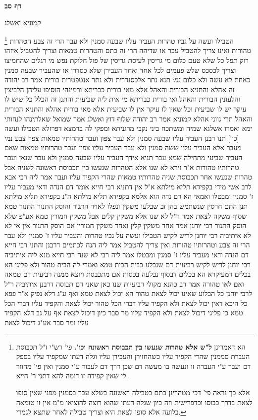 \documentclass[12pt, openany]{book}
\newcommand{\sethebfont}{
\fontsize{10.5pt}{21.0pt} \selectfont
}
\newcommand{\twocol}[1]{
	{\sethebfont \begin{multicols}{2}
			#1
	\end{multicols}}	
}
\newcommand{\sectname}{}
\newcommand{\newsection}[1]{
	\addcontentsline{toc}{section}{#1}
	\renewcommand{\sectname}{#1}	
	\vspace{-\baselineskip}
	\begin{center}
		\textbf{%
\fontsize{16pt}{16pt}\selectfont
			#1}
	\end{center}
	\vspace{-\baselineskip}
	\nopagebreak
}
\newcommand{\footnotecomment}[1]{
	\renewcommand\thefootnote{}
	\footnote{#1}}
\newcommand{\commenta}[1]{\footnotecomment{#1}}
\begin{document}
\newsection{דף סב}
\twocol{קמוניא ואשלג
\commenta{הא דאמרינן \textbf{ל"ש אלא טהרות שנעשו בין תכבוסת ראשונה וכו'.} פי' רש"י ז"ל תכבוסת העברת סממנין שהרי הקפיד עליו כשהחזירן והעבירן עליו וגלה דעתו שמקפיד עליו בספק דם ועבר ע"י העברה זו ונעשה בו מעשה דם שכן דרך דם לעבור ע"י סמנין ואין פי' מחוור לי שאין קפידה זו דומה להא דתני ר' חייא.\par אלא כך נראה פי' דכי מטהרינן כתם בטבילה ראשונה כשלא עבר בסמנין מפני שאין סופו לצאת בדרך כבוסו וכדפרישית וזה כיון שגלה דעתו שהוא רוצה להוציאו מ"מ אין זו טומאה בלועה אלא סופו לצאת היא וצריך טבילה לאחר שתצא לגמרי. }
הטבילו ועשה על גביו טהרות העביר עליו שבעה סמנין ולא עבר הרי זה צבע הטהרות טהורות ואינו צריך להטביל עבר או שדיהה הרי זה כתם והטהרות טמאות וצריך להטביל 
איזהו רוק תפל כל שלא טעם כלום מי גריסין לעיסת גריסין של פול חלוקת נפש מי רגלים שהחמיצו 
וצריך לכסכס שלש פעמים לכל אחד ואחד העבירן שלא כסדרן או שהעביר שבעה סמנין כאחת לא עשה ולא כלום
{\large\emph{גמ׳}} תנא נתר אלכסנדרית ולא נתר אנטפטרית
בורית אמר רב יהודה זה אהלא והתניא הבורית והאהל אלא מאי בורית כבריתא 
ורמינהי הוסיפו עליהן הלביצין והלעונין הבורית והאהל ואי בורית כבריתא מי אית ליה שביעית והתנן זה הכלל כל שיש לו עיקר יש לו שביעית וכל שאין לו עיקר אין לו שביעית אלא מאי בורית אהלא והתניא הבורית והאהל תרי גווני אהלא
קמוניא אמר רב יהודה שלוף דוץ ואשלג אמר שמואל שאלתינהו לנחותי ימא ואמרו אשלגא שמיה ומשתכח ביני נקבי מרגניתא ומפקי לה ברמצא דפרזלא
הטבילו ועשה [כו'] תנו רבנן העביר עליו שבעה סמנין ולא עבר צפון ועבר טהרותיו טמאות 
צפון צבע נמי מעבר אלא העביר עליו ששה סמנין ולא עבר העביר עליו צפון ועבר טהרותיו טמאות שאם העביר שביעי מתחילה שמא עבר 
תניא אידך העביר עליו שבעה סמנין ולא עבר שנאן ועבר טהרותיו טהורות 
א"ר זירא לא שנו אלא הטהרות שנעשו בין תכבוסת ראשונה לשניה אבל טהרות שנעשו אחר תכבוסת שניה טהרותיו טמאות שהרי הקפיד עליו ועבר
אמר ליה רבי אבא לרב אשי מידי בקפידא תליא מילתא 
א"ל אין דתניא רבי חייא אומר דם הנדה ודאי מעביר עליו ז' סמנין ומבטלו
ואמאי הא דם נדה הוא אלמא בקפידא תליא מילתא ה"נ בקפידא תליא מילתא 
תנן התם חרסין שנשתמש בהן זב שבלעו משקין ונפלו לאויר התנור והוסק התנור התנור טמא שסוף משקה לצאת 
אמר ר"ל לא שנו אלא משקין קלים אבל משקין חמורין טמא אע"פ שלא הוסק התנור רבי יוחנן אמר אחד משקין קלין ואחד משקין חמורין אם הוסק התנור אין אי לא לא 
איתיביה רבי יוחנן לריש לקיש הטבילו ועשה על גביו טהרות והעביר עליו ז' סמנין ולא עבר הרי זה צבע וטהרותיו טהורות ואין צריך להטביל 
אמר ליה הנח לכתמים דרבנן 
והתני רבי חייא דם הנדה ודאי מעביר עליו ז' סמנין ומבטלו 
אמר ליה רבי לא שנה רבי חייא מנא ליה 
איתיביה רבי יוחנן לריש לקיש רביעית דם שנבלע בבית הבית טמא ואמרי לה הבית טהור ולא פליגי הא בכלים דמעיקרא הא בכלים דבסוף 
נבלעה בכסות אם מתכבסת ויוצא ממנה רביעית דם טמאה ואם לאו טהורה 
אמר רב כהנא מקולי רביעיות שנו כאן שאני דם תבוסה דרבנן 
איתיביה ר"ל לרבי יוחנן כל הבלוע שאינו יכול לצאת טהור הא יכול לצאת טמא ואף ע"ג דלא נפיק 
א"ר פפא כל היכא דאין יכול לצאת ולא הקפיד עליו דברי הכל טהור יכול לצאת והקפיד עליו דברי הכל טמא
כי פליגי דיכול לצאת ולא הקפיד עליו מר סבר כיון דיכול לצאת אף על גב דלא הקפיד עליו ומר סבר אע"ג דיכול לצאת}
\end{document}
